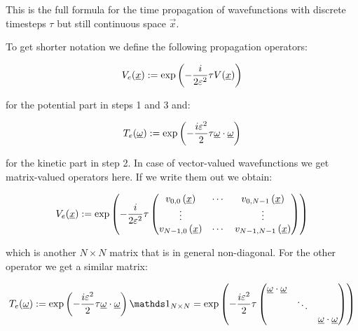 
This is the full formula for the time propagation of wavefunctions with discrete
timesteps $\tau$ but still continuous space $\vec{x}$.

To get shorter notation we define the following propagation operators:

\begin{equation}
  V_e(\underline{x}) := \exp\left(-\frac{i}{2\varepsilon^2} \tau V(\underline{x})\right)
\end{equation}

for the potential part in steps 1 and 3 and:

\begin{equation}
  T_e(\underline{\omega}) := \exp\left(-\frac{i\varepsilon^2}{2} \tau \underline{\omega} \cdot \underline{\omega}\right)
\end{equation}

for the kinetic part in step 2. In case of vector-valued wavefunctions we get
matrix-valued operators here. If we write them out we obtain:

\begin{equation}
  V_e(\underline{x}) := \exp\left(
    -\frac{i}{2\varepsilon^2} \tau
    \begin{pmatrix}
      v_{0,0}\left( \underline{x} \right) & \cdots & v_{0,N-1}\left( \underline{x} \right) \\
      \vdots         &        & \vdots \\
      v_{N-1,0}\left( \underline{x} \right) & \cdots & v_{N-1,N-1}\left( \underline{x} \right)
    \end{pmatrix}
  \right)
\end{equation}

which is another $N \times N$ matrix that is in general non-diagonal. For the
other operator we get a similar matrix:

\begin{equation}
  T_e(\vec{\omega}) \assign \exp\left(
    -\frac{i\varepsilon^2}{2} \tau \vec{\omega}\cdot\vec{\omega}
  \right) \id_{N\times N}
  =
 \exp\left(
    -\frac{i\varepsilon^2}{2} \tau
    \begin{pmatrix}
      \vec{\omega}\cdot\vec{\omega} & {}     & {} \\
      {}                            & \ddots & {} \\
      {}                            & {}     & \vec{\omega}\cdot\vec{\omega}
    \end{pmatrix}
  \right)
\end{equation}

